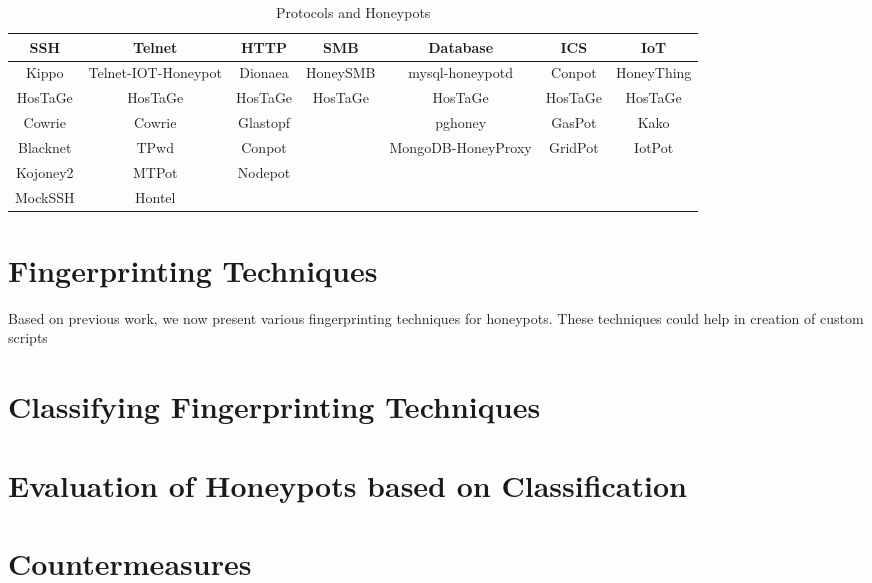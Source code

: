 \documentclass[letterpaper, 10 pt, conference]{ieeeconf}  %
\begin{document}
\begin{table*}[ht!]
\caption{\label{tab:Table1}Protocols and Honeypots}
\centering
 \begin{tabular}{||c c c c c c c||} 
 \hline
 SSH & Telnet & HTTP & SMB & Database & ICS & IoT\\ [0.5ex] 
 \hline
 Kippo & Telnet-IOT-Honeypot & Dionaea & HoneySMB & mysql-honeypotd & Conpot & HoneyThing\\ 
 
 HosTaGe &  HosTaGe &  HosTaGe &  HosTaGe &  HosTaGe &  HosTaGe &  HosTaGe  \\
 
 Cowrie & Cowrie & Glastopf &  & pghoney & GasPot & Kako\\

 Blacknet & TPwd & Conpot &  & MongoDB-HoneyProxy & GridPot & IotPot\\
 
 Kojoney2 & MTPot & Nodepot & & & & \\
 
 MockSSH & Hontel &  &  & & & \\ [1ex] 
 \hline
\end{tabular}

\end{table*}








\section{Fingerprinting Techniques}

Based on previous work, we now present various fingerprinting techniques for honeypots. These techniques could help in creation of custom scripts 




 \section{Classifying Fingerprinting Techniques}
   


 \section{Evaluation of Honeypots based on Classification}
 
 
 
 \section {Countermeasures}
 
\end{document}
